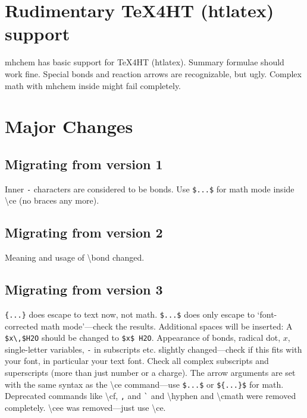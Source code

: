 \documentclass[a4paper,notitlepage,parskip=half]{scrreprt}
\newcommand\macro[1]{{\ttfamily\textbackslash#1}}
\begin{document}
\begin{SideBySideExample}[xrightmargin=3cm]
\end{SideBySideExample}

\begin{SideBySideExample}[xrightmargin=3cm]
\end{SideBySideExample}



\section{Rudimentary \TeX 4HT (htlatex) support}

mhchem has basic support for \TeX 4HT (htlatex). Summary formulae should work fine. Special bonds and reaction arrows are recognizable, but ugly. Complex math with mhchem inside might fail completely.

\clearpage
\section{Major Changes}
\label{sec:WhatSNew}

\subsection{Migrating from version 1}

Inner \verb|-| characters are considered to be bonds. Use \verb|$...$| for math mode inside \macro{ce} (no braces any more).

\subsection{Migrating from version 2}

Meaning and usage of \macro{bond} changed.

\subsection{Migrating from version 3}

\verb|{...}| does escape to text now, not math. \verb|$...$| does only escape to `font-corrected math mode'---check the results. Additional spaces will be inserted: A \verb|$x\,$H2O| should be changed to \verb|$x$ H2O|. Appearance of bonds, radical dot, $x$, single-letter variables, \verb|-| in subscripts etc. slightly changed---check if this fits with your font, in particular your text font. Check all complex subscripts and superscripts (more than just number or a charge). The arrow arguments are set with the same syntax as the \macro{ce} command---use \verb|$...$| or \verb|${...}$| for math. Deprecated commands like \macro{cf}, \verb|,| and \verb|`| and \macro{hyphen} and \macro{cmath} were removed completely. \macro{cee} was removed---just use \macro{ce}.
\end{document}
